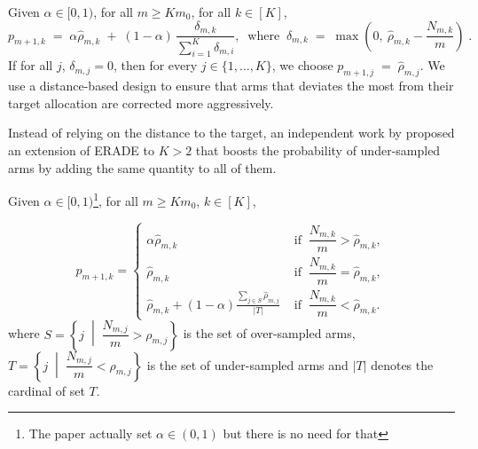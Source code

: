 \begin{example}
	Given $\alpha \in [0,1)$, for all $m\geq Km_0$, for all $k \in [K]$,
	\begin{equation*}\label{eq:example}
		p_{m+1,k} \;=\; \alpha \hat{\rho}_{m,k} \;+\; (1-\alpha)\,
		\frac{\delta_{m,k}}{\sum_{i=1}^K \delta_{m,i}},
		\ \text{ where } \
		\delta_{m,k} \;=\; \max\!\left(0,\ \hat{\rho}_{m,k} - \frac{N_{m,k}}{m}\right)\;.
	\end{equation*}
	If for all $j$, $\delta_{m,j}=0$, then for every $j \in \{1,\ldots,K\}$, we choose \(p_{m+1,j} \;=\; \hat{\rho}_{m,j}.\) We use a distance-based design to ensure that arms that deviates the most from their target allocation are corrected more aggressively.
\end{example}


\smallskip

Instead of relying on the distance to the target, an independent work by \citep{alkhnefr2025efficient} proposed an extension of ERADE to $K>2$ that boosts the probability of under-sampled arms by adding the same quantity to all of them.

\begin{example}
	Given $\alpha \in [0,1)$\footnote{The paper actually set $\alpha \in (0,1)$ but there is no need for that}, for all $m\geq Km_0$, $k \in [K]$,
	
	\[
	p_{m+1,k} =
	\begin{cases}
		\alpha \hat{\rho}_{m,k} &
		\text{ if } \ \dfrac{N_{m,k}}{m} > \hat{\rho}_{m,k}, \\[6pt]
		\hat{\rho}_{m,k} &
		\text{ if } \ \dfrac{N_{m,k}}{m} = \hat{\rho}_{m,k}, \\[6pt]
		\hat{\rho}_{m,k} + (1-\alpha)\displaystyle\frac{\sum_{j \in S}\hat{\rho}_{m,j}}{|T|} &
		\text{ if } \ \dfrac{N_{m,k}}{m} < \hat{\rho}_{m,k}.
	\end{cases}
	\]
	where $S = \left\{ j \; \middle| \; \dfrac{N_{m,j}}{m} > \rho_{m,j} \right\}$ is the set of over-sampled arms,  $T = \left\{ j \; \middle| \; \dfrac{N_{m,j}}{m} < \rho_{m,j} \right\}$ is the set of under-sampled arms and $|T|$ denotes the cardinal of set $T$.
\end{example}

